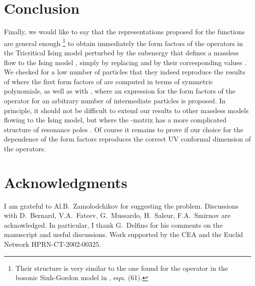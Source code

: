 \documentclass[11pt,a4paper]{article}
\begin{document}
\section{Conclusion}
Finally, we would like to say that the representations proposed
for the functions \coordHE{} are general enough
\footnote{Their structure is very similar to the one found for the
operator \coordHE{} in the bosonic Sinh-Gordon model in
\cite{BK}, equ. (61).} to obtain immediately the form factors of the
operators \myHighlight{$\Theta, \epsilon,\sigma,\mu$}\coordHE{} in the Tricritical Ising
model perturbed by the subenergy that defines a massless flow
 to the Ising model \cite{KMS,AZ}, simply by replacing \coordHE{}
 and \coordHE{} by their
corresponding values \cite{Z}. We checked for a low number of
particles that they indeed reproduce the results of \cite{DMS}
where the first form factors of \myHighlight{$\Theta,\sigma,\mu$}\coordHE{}
 are computed in terms of symmetric polynomials,
as well as with \cite{MS}, where an expression for the form
factors of the operator \myHighlight{$\Theta$}\coordHE{} for an arbitrary number of
intermediate particles is proposed. In principle, it should not be
difficult to extend our results to other massless models flowing
to the Ising model,
 but where the \coordHE{}-matrix has a more complicated structure of resonance poles \cite{Z}.
Of course it remains to prove if our choice for the \myHighlight{$\alpha$}\coordHE{} dependence
of the form factors reproduces the correct UV conformal dimension of the operators.

\section*{Acknowledgments}
I am grateful to Al.B.~Zamolodchikov for suggesting the problem.
Discussions with D.~Bernard, V.A.~Fateev, G.~Mussardo, H.~Saleur, F.A.~Smirnov are
acknowledged. In particular, I thank G.~Delfino for his
comments on the manuscript and useful discussions. Work supported
by the CEA and the Euclid Network HPRN-CT-2002-00325.
\end{document}
